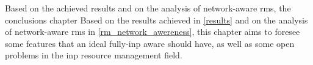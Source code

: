 \ifdefined\THESISSUMMARY
Based on the achieved results and on the analysis of network-aware \glspl{rm}, the conclusions chapter
\else
Based on the results achieved in \autoref{results} and on the analysis of network-aware \glspl{rm} in \autoref{rm_network_awereness}, this chapter
\fi
aims to foresee some features that an ideal fully-\gls{inp} aware  should have, as well as some open problems in the \gls{inp} resource management field.
